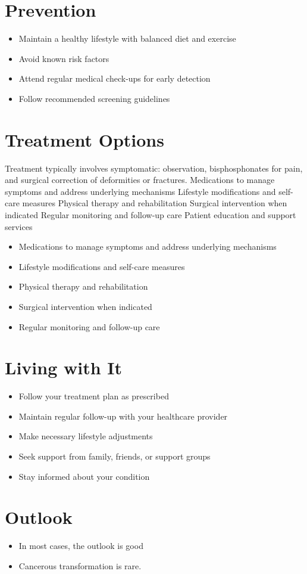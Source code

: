 \section{Prevention}
\begin{itemize}[noitemsep]
  \item Maintain a healthy lifestyle with balanced diet and exercise
  \item Avoid known risk factors
  \item Attend regular medical check-ups for early detection
  \item Follow recommended screening guidelines
\end{itemize}
\section{Treatment Options}
Treatment typically involves symptomatic: observation, bisphosphonates for pain, and surgical correction of deformities or fractures. Medications to manage symptoms and address underlying mechanisms Lifestyle modifications and self-care measures Physical therapy and rehabilitation Surgical intervention when indicated Regular monitoring and follow-up care Patient education and support services

\begin{itemize}[noitemsep]
  \item Medications to manage symptoms and address underlying mechanisms
  \item Lifestyle modifications and self-care measures
  \item Physical therapy and rehabilitation
  \item Surgical intervention when indicated
  \item Regular monitoring and follow-up care
\end{itemize}
\section{Living with It}
\begin{itemize}[noitemsep]
  \item Follow your treatment plan as prescribed
  \item Maintain regular follow-up with your healthcare provider
  \item Make necessary lifestyle adjustments
  \item Seek support from family, friends, or support groups
  \item Stay informed about your condition
\end{itemize}
\section{Outlook}
\begin{itemize}[noitemsep]
  \item In most cases, the outlook is good
  \item Cancerous transformation is rare.
\end{itemize}
